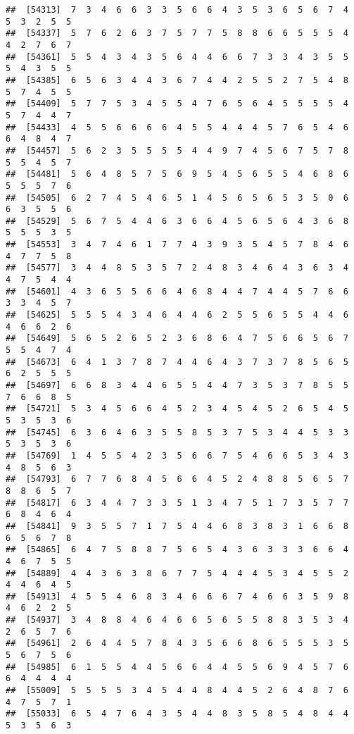 \documentclass[
]{book}
\begin{document}
\begin{verbatim}
##  [54313]  7  3  4  6  6  3  3  5  6  6  4  3  5  3  6  5  6  7  4  5  3  2  5  5
##  [54337]  5  7  6  2  6  3  7  5  7  7  5  8  8  6  6  5  5  5  4  4  2  7  6  7
##  [54361]  5  5  4  3  4  3  5  6  4  4  6  6  7  3  3  4  3  5  5  5  4  3  5  5
##  [54385]  6  5  6  3  4  4  3  6  7  4  4  2  5  5  2  7  5  4  8  5  7  4  5  5
##  [54409]  5  7  7  5  3  4  5  5  4  7  6  5  6  4  5  5  5  5  4  5  7  4  4  7
##  [54433]  4  5  5  6  6  6  6  4  5  5  4  4  4  5  7  6  5  4  6  6  4  8  4  7
##  [54457]  5  6  2  3  5  5  5  5  4  4  9  7  4  5  6  7  5  7  8  5  5  4  5  7
##  [54481]  5  6  4  8  5  7  5  6  9  5  4  5  6  5  5  4  6  8  6  5  5  5  7  6
##  [54505]  6  2  7  4  5  4  6  5  1  4  5  6  5  6  5  3  5  0  6  6  3  5  5  6
##  [54529]  5  6  7  5  4  4  6  3  6  6  4  5  6  5  6  4  3  6  8  5  5  5  3  5
##  [54553]  3  4  7  4  6  1  7  7  4  3  9  3  5  4  5  7  8  4  6  4  7  7  5  8
##  [54577]  3  4  4  8  5  3  5  7  2  4  8  3  4  6  4  3  6  3  4  4  7  5  4  4
##  [54601]  4  3  6  5  5  6  6  4  6  8  4  4  7  4  4  5  7  6  6  3  3  4  5  7
##  [54625]  5  5  5  4  3  4  6  4  4  6  2  5  5  6  5  5  4  4  6  4  6  6  2  6
##  [54649]  5  6  5  2  6  5  2  3  6  8  6  4  7  5  6  6  5  6  7  5  5  4  7  4
##  [54673]  6  4  1  3  7  8  7  4  4  6  4  3  7  3  7  8  5  6  5  6  2  5  5  5
##  [54697]  6  6  8  3  4  4  6  5  5  4  4  7  3  5  3  7  8  5  5  7  6  6  8  5
##  [54721]  5  3  4  5  6  6  4  5  2  3  4  5  4  5  2  6  5  4  5  5  3  5  3  6
##  [54745]  6  3  6  4  6  3  5  5  8  5  3  7  5  3  4  4  5  3  3  5  3  5  3  6
##  [54769]  1  4  5  5  4  2  3  5  6  6  7  5  4  6  6  5  3  4  3  4  8  5  6  3
##  [54793]  6  7  7  6  8  4  5  6  6  4  5  2  4  8  8  5  6  5  7  8  8  6  5  7
##  [54817]  6  3  4  4  7  3  3  5  1  3  4  7  5  1  7  3  5  7  7  6  8  4  6  4
##  [54841]  9  3  5  5  7  1  7  5  4  4  6  8  3  8  3  1  6  6  8  6  5  6  7  8
##  [54865]  6  4  7  5  8  8  7  5  6  5  4  3  6  3  3  3  6  6  4  4  6  7  5  5
##  [54889]  4  4  3  6  3  8  6  7  7  5  4  4  4  5  3  4  5  5  2  4  4  6  4  5
##  [54913]  4  5  5  4  6  8  3  4  6  6  6  7  4  6  6  3  5  9  8  4  6  2  2  5
##  [54937]  3  4  8  8  4  6  4  6  6  5  6  5  5  8  8  3  5  3  4  2  6  5  7  6
##  [54961]  2  6  4  4  5  7  8  4  3  5  6  6  8  6  5  5  5  3  5  5  6  7  5  6
##  [54985]  6  1  5  5  4  4  5  6  6  4  4  5  5  6  9  4  5  7  6  6  4  4  4  4
##  [55009]  5  5  5  5  3  4  5  4  4  8  4  4  5  2  6  4  8  7  6  4  7  5  7  1
##  [55033]  6  5  4  7  6  4  3  5  4  4  8  3  5  8  5  4  8  4  4  5  3  5  6  3

\end{verbatim}
\end{document}
